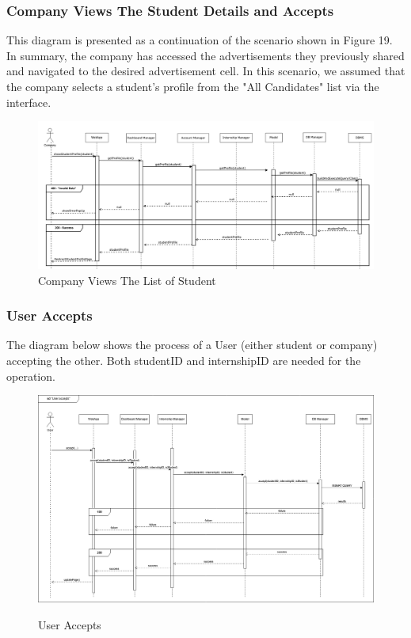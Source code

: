 \documentclass[a4paper,12pt]{article}
\begin{document}
\subsubsection*{ Company Views The Student Details and Accepts} 
This diagram is presented as a continuation of the scenario shown in Figure 19. In summary, the company has accessed the advertisements they previously shared and navigated to the desired advertisement cell. In this scenario, we assumed that the company selects a student's profile from the "All Candidates" list via the interface. 
\begin{figure}[H]
    \centering
    \includegraphics[scale = 0.7]{DD_figures/RuntimeView/companyViewStudentDetails.drawio.png}
    \caption{Company Views The List of Student}
    \centering
\end{figure}

\newpage

\subsubsection*{User Accepts}
The diagram below shows the process of a User (either student or company) accepting the other. Both studentID and internshipID are needed for the operation.
\begin{figure}[H]
\centering
\includegraphics[scale = 0.35]{DD_figures/RuntimeView/UserAcceptsRV.png}\\
\caption{User Accepts}
\end{figure}
\end{document}
